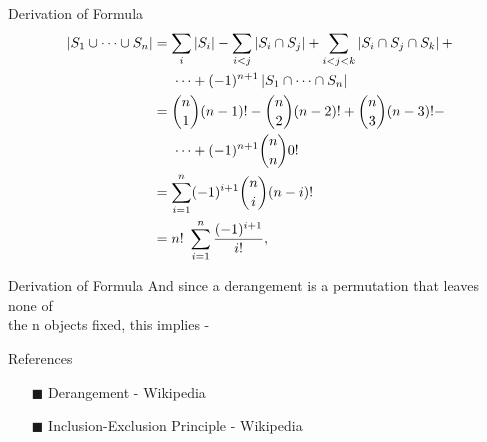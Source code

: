 \documentclass[9pt]{beamer}
\begin{document}
\begin{frame}{Derivation of Formula}
    \begin{align*}
     \left|S_1 \cup \dotsm \cup S_n\right|
  &= \sum_i \left|S_i\right|
    - \sum_{i < j} \left|S_i \cap S_j\right|
    + \sum_{i < j < k} \left|S_i \cap S_j \cap S_k\right|
    + \\
  & \hspace{0.5cm} \cdots +(-1)^{n + 1} \left|S_1 \cap \dotsm \cap S_n\right|\\
  &= \binom{n}{1}(n - 1)! - \binom{n}{2}(n - 2)! + \binom{n}{3}(n - 3)! - \\
  &  \hspace{0.5cm} \cdots + (-1)^{n+1}\binom{n}{n} 0!\\
  &= \sum_{i=1}^n (-1)^{i+1}\binom{n}{i}(n - i)!\\
  &= n!\ \sum_{i=1}^n {(-1)^{i+1} \over i!},
\end{align*}

\end{frame}


\begin{frame}{Derivation of Formula}
And since a derangement is a permutation that leaves none of\\
the n objects fixed, this implies -\\
\vspace{1cm}
\centering
{}

\end{frame}

\begin{frame}{References}

\begin{itemize}

    \item[$\blacksquare$] Derangement - Wikipedia
    \item[$\blacksquare$] Inclusion-Exclusion Principle - Wikipedia
\end{itemize}

\end{frame}
\end{document}
